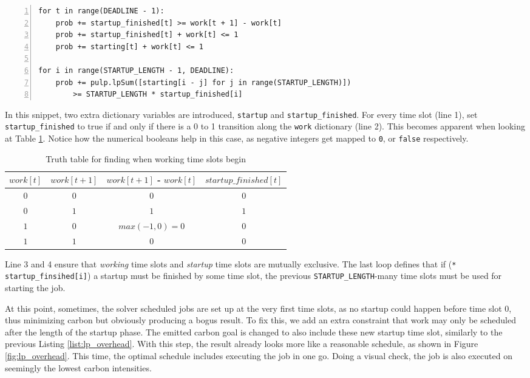 \begin{minipage}{\linewidth} %
\begin{lstlisting}[frame=single, numbers=left, caption={LP Implementation for overhead}, label={list:lp_overhead}, basicstyle=\ttfamily]
for t in range(DEADLINE - 1):
    prob += startup_finished[t] >= work[t + 1] - work[t]
    prob += startup_finished[t] + work[t] <= 1
    prob += starting[t] + work[t] <= 1

for i in range(STARTUP_LENGTH - 1, DEADLINE):
    prob += pulp.lpSum([starting[i - j] for j in range(STARTUP_LENGTH)]) 
        >= STARTUP_LENGTH * startup_finished[i]
\end{lstlisting}
\end{minipage}


In this snippet, two extra dictionary variables are introduced, \verb|startup| and \verb|startup_finished|.
For every time slot (line 1), set \verb|startup_finished| to true if and only if there is a 0 to 1 transition along the \verb|work| dictionary (line 2). This becomes apparent when looking at Table \ref{tab:truth_table_startup_finished}.
Notice how the numerical booleans help in this case, as negative integers get mapped to \verb|0|, or \verb|false| respectively.

\begin{table}[h!]
\centering
\begin{tabular}{|c|c|c|c|}
\hline
    $work[t]$ & $work[t+1]$ & $work[t+1]$ - $work[t]$ & $startup\_finished[t]$ \\ \hline
    $0$ & $0$ & $0$ & $0$ \\ \hline
    $0$ & $1$ & $1$ & $1$ \\ \hline
    $1$ & $0$ & $max(-1, 0) = 0$ & $0$ \\ \hline
    $1$ & $1$ & $0$ & $0$ \\ \hline
\end{tabular}
\caption{Truth table for finding when working time slots begin}
\label{tab:truth_table_startup_finished}
\end{table}

Line 3 and 4 ensure that \emph{working} time slots and \emph{startup} time slots are mutually exclusive.
The last loop defines that if (\verb|* startup_finsihed[i]|) a startup must be finished by some time slot, the previous \verb|STARTUP_LENGTH|-many time slots must be used for starting the job.

At this point, sometimes, the solver scheduled jobs are set up at the very first time slots, as no startup could happen before time slot $0$, thus minimizing carbon but obviously producing a bogus result.
To fix this, we add an extra constraint that work may only be scheduled after the length of the startup phase.
The emitted carbon goal is changed to also include these new startup time slot, similarly to the previous Listing \ref{list:lp_overhead}.
With this step, the result already looks more like a reasonable schedule, as shown in Figure \ref{fig:lp_overhead}. 
This time, the optimal schedule includes executing the job in one go.
Doing a visual check, the job is also executed on seemingly the lowest carbon intensities.

